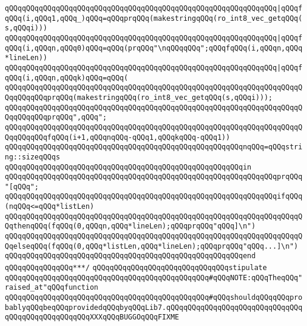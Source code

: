 \verb|qQQqqQQqqQQqqQQqqQQqqQQqqQQqqQQqqQQqqQQqqQQqqQQqqQQqqQQqqQQqqQQq|\verb#|qQQqfqQQq(i,qQQq1,qQQq_)qQQq=qQQqprqQQq(makestringqQQq(ro_int8_vec_getqQQq(s,qQQqi)))#\newline
\verb|qQQqqQQqqQQqqQQqqQQqqQQqqQQqqQQqqQQqqQQqqQQqqQQqqQQqqQQqqQQqqQQq|\verb#|qQQqfqQQq(i,qQQqn,qQQq0)qQQq=qQQq(prqQQq"\nqQQqqQQq";qQQqfqQQq(i,qQQqn,qQQq*lineLen))#\newline
\verb|qQQqqQQqqQQqqQQqqQQqqQQqqQQqqQQqqQQqqQQqqQQqqQQqqQQqqQQqqQQqqQQq|\verb#|qQQqfqQQq(i,qQQqn,qQQqk)qQQq=qQQq(#\newline
\verb|qQQqqQQqqQQqqQQqqQQqqQQqqQQqqQQqqQQqqQQqqQQqqQQqqQQqqQQqqQQqqQQqqQQqqQQqqQQqqQQqprqQQq(makestringqQQq(ro_int8_vec_getqQQq(s,qQQqi)));|\newline
\verb|qQQqqQQqqQQqqQQqqQQqqQQqqQQqqQQqqQQqqQQqqQQqqQQqqQQqqQQqqQQqqQQqqQQqqQQqqQQqqQQqprqQQq",qQQq";|\newline
\verb|qQQqqQQqqQQqqQQqqQQqqQQqqQQqqQQqqQQqqQQqqQQqqQQqqQQqqQQqqQQqqQQqqQQqqQQqqQQqqQQqfqQQq(i+1,qQQqnqQQq-qQQq1,qQQqkqQQq-qQQq1))|\newline
\verb|qQQqqQQqqQQqqQQqqQQqqQQqqQQqqQQqqQQqqQQqqQQqqQQqqQQqqQQqnqQQq=qQQqstring::sizeqQQqs|\newline
\verb|qQQqqQQqqQQqqQQqqQQqqQQqqQQqqQQqqQQqqQQqqQQqqQQqqQQqqQQqin|\newline
\verb|qQQqqQQqqQQqqQQqqQQqqQQqqQQqqQQqqQQqqQQqqQQqqQQqqQQqqQQqqQQqqQQqprqQQq"[qQQq";|\newline
\verb|qQQqqQQqqQQqqQQqqQQqqQQqqQQqqQQqqQQqqQQqqQQqqQQqqQQqqQQqqQQqqQQqifqQQq(nqQQq<=qQQq*listLen)|\newline
\verb|qQQqqQQqqQQqqQQqqQQqqQQqqQQqqQQqqQQqqQQqqQQqqQQqqQQqqQQqqQQqqQQqqQQqqQQqthenqQQq(fqQQq(0,qQQqn,qQQq*lineLen);qQQqprqQQq"qQQq]\n")|\newline
\verb|qQQqqQQqqQQqqQQqqQQqqQQqqQQqqQQqqQQqqQQqqQQqqQQqqQQqqQQqqQQqqQQqqQQqqQQqelseqQQq(fqQQq(0,qQQq*listLen,qQQq*lineLen);qQQqprqQQq"qQQq...]\n")|\newline
\verb|qQQqqQQqqQQqqQQqqQQqqQQqqQQqqQQqqQQqqQQqqQQqqQQqqQQqqQQqend|\newline
\verb|qQQqqQQqqQQqqQQq***/|\newline
\newline
\verb|qQQqqQQqqQQqqQQqqQQqqQQqqQQqqQQqstipulate|\newline
\newline
\verb|qQQqqQQqqQQqqQQqqQQqqQQqqQQqqQQqqQQqqQQqqQQqqQQq#qQQqNOTE:qQQqTheqQQq"raised_at"qQQqfunction|\newline
\verb|qQQqqQQqqQQqqQQqqQQqqQQqqQQqqQQqqQQqqQQqqQQqqQQq#qQQqshouldqQQqqQQqprobablyqQQqbeqQQqprovidedqQQqbyqQQqLib7.qQQqqQQqqQQqqQQqqQQqqQQqqQQqqQQqqQQqqQQqqQQqqQQqqQQqXXXqQQqBUGGOqQQqFIXME|\newline
